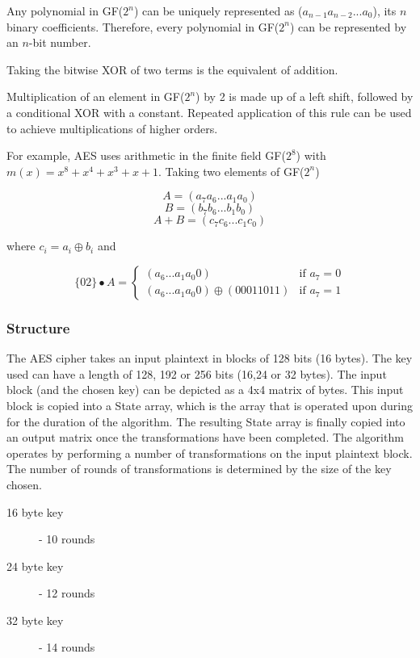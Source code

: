 \documentclass[a4paper,12pt]{report}
\begin{document}
Any polynomial in GF($2^{n}$) can be uniquely represented as ($a_{n-1}a_{n-2}...a_{0}$), its $n$ binary coefficients. Therefore, every polynomial in GF($2^{n}$) can be represented by an $n$-bit number. 

Taking the bitwise XOR of two terms is the equivalent of addition. 

Multiplication of an element in GF($2^{n}$) by 2 is made up of a left shift, followed by a conditional XOR with a constant. Repeated application of this rule can be used to achieve multiplications of higher orders.

For example, AES uses arithmetic in the finite field GF($2^{8}$) with $m(x) = x^{8} + x^{4} + x^{3} + x + 1$. Taking two elements of GF($2^{n}$)

\[ A = (a_{7}a_{6}...a_{1}a_{0}) \]
\[ B = (b_{7}b_{6}...b_{1}b_{0}) \]
\[ A + B = (c_{7}c_{6}...c_{1}c_{0})\]

where $c_{i} = a_{i} \oplus b_{i}$ and

\[
    \{02\} \bullet A = 
\begin{cases}
    (a_{6}...a_{1}a_{0}0) & \text{if } a_{7} = 0\\
    (a_{6}...a_{1}a_{0}0) \oplus (00011011) & \text{if } a_{7} = 1
\end{cases}
\]

\subsubsection{Structure}

The AES cipher takes an input plaintext in blocks of 128 bits (16 bytes). The key used can have a length of 128, 192 or 256 bits (16,24 or 32 bytes). The input block (and the chosen key) can be depicted as a 4x4 matrix of bytes. This input block is copied into a State array, which is the array that is operated upon during for the duration of the algorithm. The resulting State array is finally copied into an output matrix once the transformations have been completed. The algorithm operates by performing a number of transformations on the input plaintext block. The number of rounds of transformations is determined by the size of the key chosen. 

\begin{description}
 \item[16 byte key] - 10 rounds
 \item[24 byte key] - 12 rounds
 \item[32 byte key] - 14 rounds
\end{description}
\end{document}
